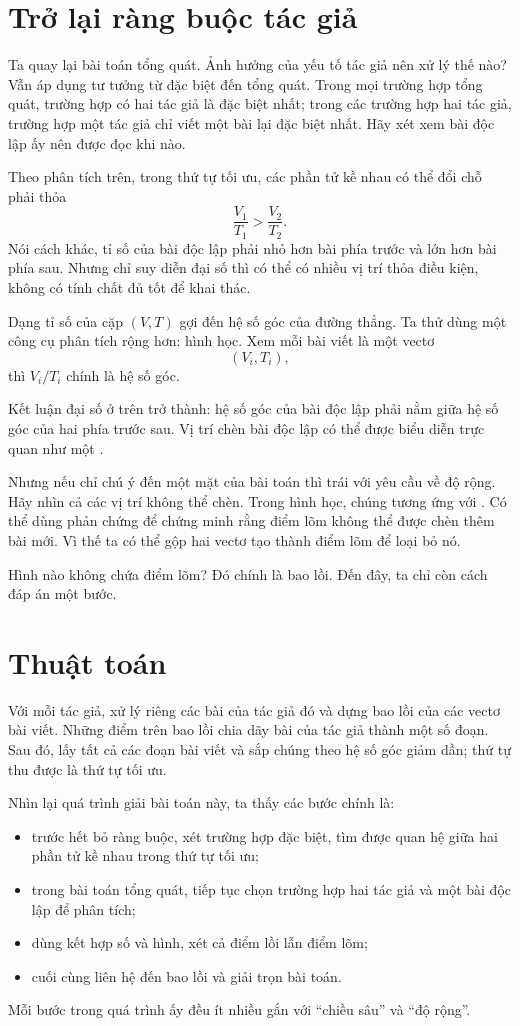 \documentclass[11pt]{article}
\begin{document}
\section{Trở lại ràng buộc tác giả}

Ta quay lại bài toán tổng quát. Ảnh hưởng của yếu tố tác giả nên xử lý thế
nào? Vẫn áp dụng tư tưởng từ đặc biệt đến tổng quát. Trong mọi trường hợp
tổng quát, trường hợp có hai tác giả là đặc biệt nhất; trong các trường hợp
hai tác giả, trường hợp một tác giả chỉ viết một bài lại đặc biệt nhất. Hãy
xét xem bài độc lập ấy nên được đọc khi nào.

Theo phân tích trên, trong thứ tự tối ưu, các phần tử kề nhau có thể đổi chỗ
phải thỏa
\[
  \frac{V_1}{T_1}>\frac{V_2}{T_2}.
\]
Nói cách khác, tỉ số của bài độc lập phải nhỏ hơn bài phía trước và lớn hơn
bài phía sau. Nhưng chỉ suy diễn đại số thì có thể có nhiều vị trí thỏa điều
kiện, không có tính chất đủ tốt để khai thác.

Dạng tỉ số của cặp \((V,T)\) gợi đến hệ số góc của đường thẳng. Ta thử dùng
một công cụ phân tích rộng hơn: hình học. Xem mỗi bài viết là một vectơ
\[
  (V_i,T_i),
\]
thì \(V_i/T_i\) chính là hệ số góc.

Kết luận đại số ở trên trở thành: hệ số góc của bài độc lập phải nằm giữa hệ
số góc của hai phía trước sau. Vị trí chèn bài độc lập có thể được biểu diễn
trực quan như một .

Nhưng nếu chỉ chú ý đến một mặt của bài toán thì trái với yêu cầu về độ rộng.
Hãy nhìn cả các vị trí không thể chèn. Trong hình học, chúng tương ứng với
. Có thể dùng phản chứng để chứng minh rằng điểm lõm không thể
được chèn thêm bài mới. Vì thế ta có thể gộp hai vectơ tạo thành điểm lõm để
loại bỏ nó.

Hình nào không chứa điểm lõm? Đó chính là bao lồi. Đến đây, ta chỉ còn cách
đáp án một bước.

\section{Thuật toán}

Với mỗi tác giả, xử lý riêng các bài của tác giả đó và dựng bao lồi của các
vectơ bài viết. Những điểm trên bao lồi chia dãy bài của tác giả thành một số
đoạn. Sau đó, lấy tất cả các đoạn bài viết và sắp chúng theo hệ số góc giảm
dần; thứ tự thu được là thứ tự tối ưu.

Nhìn lại quá trình giải bài toán này, ta thấy các bước chính là:
\begin{itemize}
  \item trước hết bỏ ràng buộc, xét trường hợp đặc biệt, tìm được quan hệ
  giữa hai phần tử kề nhau trong thứ tự tối ưu;
  \item trong bài toán tổng quát, tiếp tục chọn trường hợp hai tác giả và một
  bài độc lập để phân tích;
  \item dùng kết hợp số và hình, xét cả điểm lồi lẫn điểm lõm;
  \item cuối cùng liên hệ đến bao lồi và giải trọn bài toán.
\end{itemize}
Mỗi bước trong quá trình ấy đều ít nhiều gắn với ``chiều sâu'' và ``độ rộng''.
\end{document}
